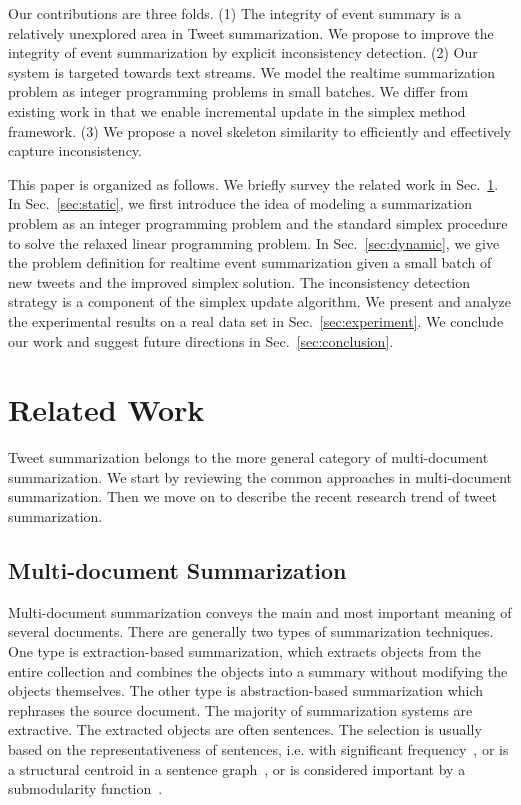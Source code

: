 \documentclass{llncs}
\begin{document}
Our contributions are three folds. (1) The integrity of event summary is a relatively unexplored area in Tweet summarization. We propose to improve the integrity of event summarization by explicit inconsistency detection. (2) Our system is targeted towards text streams. We model the realtime summarization problem as integer programming problems in small batches. We differ from existing work in that we enable incremental update in the simplex method framework. (3) We propose a novel skeleton similarity to efficiently and effectively capture inconsistency.

This paper is organized as follows. We briefly survey the related work in Sec.~\ref{sec:related}. In Sec.~\ref{sec:static}, we first introduce the idea of modeling a summarization problem as an integer programming problem and the standard simplex procedure to solve the relaxed linear programming problem. In Sec.~\ref{sec:dynamic}, we give the problem definition for realtime event summarization given a small batch of new tweets and the improved simplex solution. The inconsistency detection strategy is a component of the simplex update algorithm. We present and analyze the experimental results on a real data set in Sec.~\ref{sec:experiment}. We conclude our work and suggest future directions in Sec.~\ref{sec:conclusion}.

\section{Related Work}\label{sec:related}
Tweet summarization belongs to the more general category of multi-document summarization. We start by reviewing the common approaches in multi-document summarization. Then we move on to describe the recent research trend of tweet summarization.

\subsection{Multi-document Summarization}
Multi-document summarization conveys the main and most important meaning of several documents. There are generally two types of summarization techniques. One type is extraction-based summarization, which extracts objects from the entire collection and combines the objects into a summary without modifying the objects themselves. The other type is abstraction-based summarization which rephrases the source document. The majority of summarization systems are extractive. The extracted objects are often sentences. The selection is usually based on the representativeness of sentences, i.e. with significant frequency~\cite{Yih2007Multi-document}, or is a structural centroid in a sentence graph~\cite{Kumar2004Graph,Lin2012Generating}, or is considered important by a submodularity function~\cite{Li2011MSSF}. 
\end{document}
